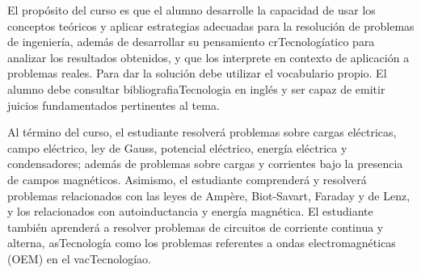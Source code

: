 \begin{syllabus}


\begin{justification}
El propósito del curso es que el alumno desarrolle la capacidad de usar los conceptos teóricos y aplicar estrategias adecuadas para la resolución de problemas de ingeniería, además de desarrollar su pensamiento crTecnologíatico para analizar los resultados obtenidos, y que los interprete en contexto de aplicación a problemas reales. Para dar la solución debe utilizar el vocabulario propio. El alumno debe consultar bibliografiaTecnologia en inglés y ser capaz de emitir juicios fundamentados pertinentes al tema. 
\end{justification}

\begin{goals}
\item Al término del curso, el estudiante resolverá problemas sobre cargas eléctricas, campo eléctrico, ley de Gauss, potencial eléctrico, energía eléctrica y condensadores; además de problemas sobre cargas y corrientes bajo la presencia de campos magnéticos. Asimismo, el estudiante comprenderá y resolverá problemas relacionados con las leyes de Ampère, Biot-Savart, Faraday y de Lenz, y los relacionados con autoinductancia y energía magnética. El estudiante también aprenderá a resolver problemas de circuitos de corriente continua y alterna, asTecnología como los problemas referentes a ondas electromagnéticas (OEM) en el vacTecnologíao.
\end{goals}

\begin{outcomes}
\item {}
\item {}
\end{outcomes}

\begin{competences}
    \item {}
\end{competences}


\end{syllabus}
